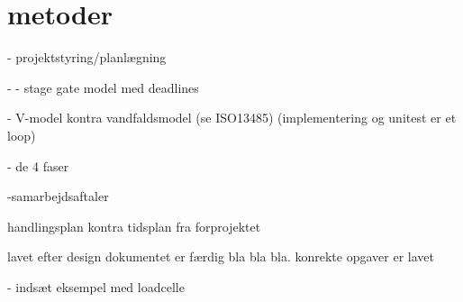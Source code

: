 \section{metoder}
- projektstyring/planlægning


- - stage gate model med deadlines


- V-model kontra vandfaldsmodel (se ISO13485) (implementering og unitest er et loop)

- de 4 faser

-samarbejdsaftaler

handlingsplan kontra tidsplan fra forprojektet

lavet efter design dokumentet er færdig bla bla bla. konrekte opgaver er lavet

- indsæt eksempel med loadcelle
